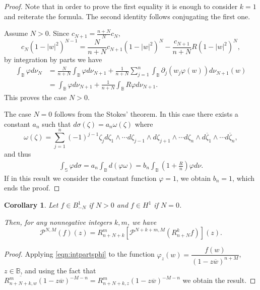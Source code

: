 \documentclass[12pt,twoside,leqno,final]{amsart}
\theoremstyle{plain}
\newtheorem{cor}[thm]{Corollary}
\begin{document}
\begin{proof}
Note that in order to prove  the first equality it is enough to consider $k=1$ and reiterate the formula.  The second identity follows  conjugating the first one. 

Assume $N>0$.
Since $c_{N+1}=\frac{n+N}{N}c_N$, $$c_N(1-|w|^2)^{N-1}=\frac{N}{n+N}c_{N+1}(1-|w|^2)^N-\frac{c_{N+1}}{n+N} R(1-|w|^2)^N,$$ by integration by parts we have
\begin{align*}
\int_{{\mathbb B}}\varphi d\nu_N
&=\frac{N}{n+N} \int_{{\mathbb B}} \varphi d\nu_{N+1} 
+\frac{1}{n+N}\sum_{j=1}^n\int_{{\mathbb B}} {\partial}_j(w_j\varphi(w))d\nu_{N+1}(w)\\
&=\int_{{\mathbb B}} \varphi d\nu_{N+1}+\frac{1}{n+N}\int_{{\mathbb B}} R\varphi d\nu_{N+1}.
\end{align*}
This proves  the case $N>0$.

The case $N=0$ follows from the Stokes' theorem. In this case there exists a constant $a_n$ such that 
$d\sigma({\zeta})=a_n \omega({\zeta})$ where 
$$
\omega({\zeta})=\sum_{j=1}^{n} (-1)^{j-1}{\zeta}_j d{\zeta}_1\land \cdots d{\zeta}_{j-1}\land d{\zeta}_{j+1}\land \cdots d{\zeta}_{n} 
\land d\overline{\zeta}_1\land \cdots d\overline{\zeta}_n,
$$
and thus 
\begin{align*}
\int_{{\mathbb S}}\varphi d\sigma =a_n\int_{{\mathbb B}} d(\varphi\omega)
=b_n \int_{{\mathbb B}}\left(1+\frac{R}{n}\right)\varphi d\nu.
\end{align*}
If in this result we consider the constant function $\varphi=1$, we obtain $b_n=1$, which ends the proof.
\end{proof}

\begin{cor}\label{cor:intpartsP}
Let $f\in B^1_{-N}$ if $N>0$ and $f\in H^1$ if $N=0$.

Then, for any nonnegative integers $k,m$, we have
\begin{equation}\label{eqn:intpartsP0}
{{\mathcal P}}^{N,M}(f)(z)=R^m_{n+N+k}\left[{{\mathcal P}}^{N+k+m,M} (R^k_{n+N}f)\right](z).
\end{equation}
\end{cor}
\begin{proof}
Applying \eqref{eqn:intpartsphi} to the function $\varphi_z(w)=\dfrac{f(w)}{(1-z\overline w)^{n+M}}$, $z\in{{\mathbb B}}$, and using the fact that $\overline{R^m_{n+N+k,w}}(1-z\overline w)^{-M-n}=R^m_{n+N+k,z}(1-z\overline w)^{-M-n}$ we obtain the result.
\end{proof}
\end{document}
